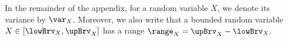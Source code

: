 
%

%
\noindent In the remainder of the appendix, for  a random variable $X$, we denote its variance  by $\var_X$.
Moreover, we also write that a bounded random variable
$X\in [\lowBrv_X,\upBrv_X]$  has a range $\range_X=\upBrv_X-\lowBrv_X.$ 

%

%

%

%
%